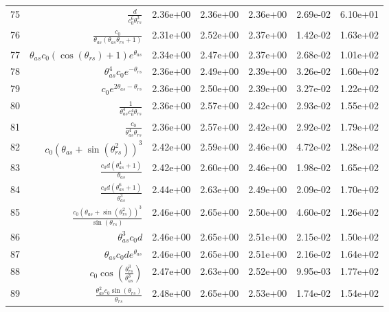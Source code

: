 \begin{tabularx}{\textwidth}{lRRRRRl}
75  &  $ \displaystyle\frac{d}{c_{0}^{6} \theta_{rs}^{3}} $  &  2.36e+00  &  2.36e+00  &  2.36e+00  &  2.69e-02  &  6.10e+01  \\ 
76  &  $ \displaystyle\frac{c_{0}}{\theta_{as} \left(\theta_{as} \theta_{rs} + 1\right)} $  &  2.31e+00  &  2.52e+00  &  2.37e+00  &  1.42e-02  &  1.63e+02  \\ 
77  &  $ \theta_{as} c_{0} \left(\cos{\left(\theta_{rs} \right)} + 1\right) e^{\theta_{as}} $  &  2.34e+00  &  2.47e+00  &  2.37e+00  &  2.68e-02  &  1.01e+02  \\ 
78  &  $ \theta_{as}^{4} c_{0} e^{- \theta_{rs}} $  &  2.36e+00  &  2.49e+00  &  2.39e+00  &  3.26e-02  &  1.60e+02  \\ 
79  &  $ c_{0} e^{2 \theta_{as} - \theta_{rs}} $  &  2.36e+00  &  2.50e+00  &  2.39e+00  &  3.27e-02  &  1.22e+02  \\ 
80  &  $ \displaystyle\frac{1}{\theta_{as}^{4} c_{0}^{4} \theta_{rs}} $  &  2.36e+00  &  2.57e+00  &  2.42e+00  &  2.93e-02  &  1.55e+02  \\ 
81  &  $ \displaystyle\frac{c_{0}}{\theta_{as}^{4} \theta_{rs}} $  &  2.36e+00  &  2.57e+00  &  2.42e+00  &  2.92e-02  &  1.79e+02  \\ 
82  &  $ c_{0} \left(\theta_{as} + \sin{\left(\theta_{rs}^{2} \right)}\right)^{3} $  &  2.42e+00  &  2.59e+00  &  2.46e+00  &  4.72e-02  &  1.28e+02  \\ 
83  &  $ \displaystyle\frac{c_{0} d \left(\theta_{as}^{4} + 1\right)}{\theta_{as}} $  &  2.42e+00  &  2.60e+00  &  2.46e+00  &  1.98e-02  &  1.65e+02  \\ 
84  &  $ \displaystyle\frac{c_{0} d \left(\theta_{as}^{6} + 1\right)}{\theta_{as}^{3}} $  &  2.44e+00  &  2.63e+00  &  2.49e+00  &  2.09e-02  &  1.70e+02  \\ 
85  &  $ \displaystyle\frac{c_{0} \left(\theta_{as} + \sin{\left(\theta_{rs}^{2} \right)}\right)^{3}}{\sin{\left(\theta_{rs} \right)}} $  &  2.46e+00  &  2.65e+00  &  2.50e+00  &  4.60e-02  &  1.26e+02  \\ 
86  &  $ \theta_{as}^{3} c_{0} d $  &  2.46e+00  &  2.65e+00  &  2.51e+00  &  2.15e-02  &  1.50e+02  \\ 
87  &  $ \theta_{as} c_{0} d e^{\theta_{as}} $  &  2.46e+00  &  2.65e+00  &  2.51e+00  &  2.16e-02  &  1.64e+02  \\ 
88  &  $ c_{0} \cos{\left(\displaystyle\frac{\theta_{rs}^{3}}{\theta_{as}^{3}} \right)} $  &  2.47e+00  &  2.63e+00  &  2.52e+00  &  9.95e-03  &  1.77e+02  \\ 
89  &  $ \displaystyle\frac{\theta_{as}^{2} c_{0} \sin{\left(\theta_{rs} \right)}}{\theta_{rs}} $  &  2.48e+00  &  2.65e+00  &  2.53e+00  &  1.74e-02  &  1.54e+02  \\ 

\end{tabularx}
